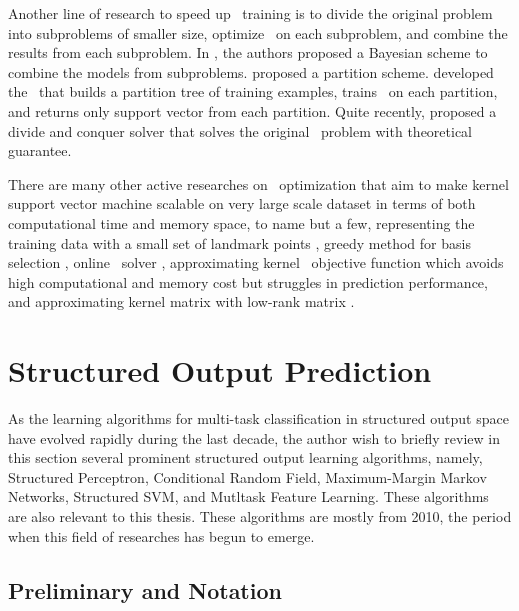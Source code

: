 {Another line of research to speed up \svm\ training is to divide the original problem into subproblems of smaller size, optimize \svm\ on each subproblem, and combine the results from each subproblem.
In \citep{Tresp00a,Schwaighofer01the}, the authors proposed a Bayesian scheme to combine the models from subproblems.
\citet{Collobert02a} proposed a partition scheme.
\citet{Graf05parallel} developed the \svmcascade\ that builds a partition tree of training examples, trains \svm\ on each partition, and returns only support vector from each partition.
Quite recently, \citet{Hsieh14a} proposed a divide and conquer solver that solves the original \svm\ problem with theoretical guarantee.

There are many other active researches on \svm\ optimization that aim to make kernel support vector machine scalable on very large scale dataset in terms of both computational time and memory space, to name but a few, representing the training data with a small set of landmark points \citep{Pavlov00towards,Boley04training,Yu05making,Zhang08improved}, greedy method for basis selection \citep{Keerthi06building}, online \svm\ solver \citep{Bordes05fast}, approximating kernel \svm\ objective function \citep{Zhang12scaling, Le13fast} which avoids high computational and memory cost but struggles in prediction performance, and approximating kernel matrix with low-rank matrix \citep{Smola00sparse,Fine02efficient,Drineas05on,Si14memory}.




%
%
\section{Structured Output Prediction}\label{sc_multi}

As the learning algorithms for multi-task classification in structured output space have evolved rapidly during the last decade, the author wish to briefly review in this section several prominent structured output learning algorithms, namely,  Structured Perceptron, Conditional Random Field, Maximum-Margin Markov Networks, Structured SVM, and Mutltask Feature Learning.
These algorithms are also relevant to this thesis.
These algorithms are mostly from 2010, the period when this field of researches has begun to emerge.


%
\subsection{Preliminary and Notation}\label{multilabel_preliminary}

}
